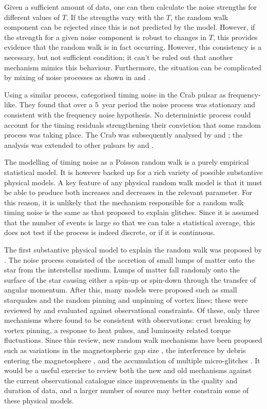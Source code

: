 Given a sufficient amount of data, one can then calculate the noise strengths
for different values of $T$. If the strengths vary with the $T$, the random
walk component can be rejected since this is not predicted by the model.
However, if the strength for a given noise component is robust to changes in
$T$, this provides evidence that the random walk is in fact occurring.  However,
this consistency is a necessary, but not sufficient condition; it can't be
ruled out that another mechanism mimics this behaviour. Furthermore, the
situation can be complicated by mixing of noise processes as shown in
\citet{Groth1975} and \citet{Cordes1980}.

Using a similar process, \citet{Boynton1972} categorised timing noise in the
Crab pulsar as frequency-like. They found that over a $5$~year period
the noise process was stationary and consistent with the frequency noise
hypothesis. No deterministic process could account for the timing residuals
strengthening their conviction that some random process was taking place. The
Crab was subsequently analysed by \citet{Groth1975} and \citet{Cordes1980}; the
analysis was extended to other pulsars by \citet{Helfand1980} and
\citet{CordesHelfand1980}.

The modelling of timing noise as a Poisson random walk is a purely
empirical statistical model. It is however backed up for a rich variety of
possible substantive physical models.  A key feature of any physical random
walk model is that it must be able to produce both increases and decreases in
the relevant parameter. For this reason, it is unlikely that the mechanism
responsible for a random walk timing noise is the same as that proposed
to explain glitches. Since it is assumed that the number of events
is large so that we can take a statistical average, this does not test if the
process is indeed discrete, or if it is continuous.

The first substantive physical model to explain the random walk was proposed by
\citet{Boynton1972}. The noise process consisted of the accretion of small
lumps of matter onto the star from the interstellar medium. Lumps of matter fall
randomly onto the surface of the star causing either a spin-up or spin-down
through the transfer of angular momentum. After this, many models were proposed
such as small starquakes and the random pinning and unpinning of vortex lines; these
were reviewed by \citet{Cordes1981} and evaluated against observational
constraints. Of these, only three mechanisms where found to be consistent with
observations: crust breaking by vortex pinning, a response to heat pulses, and
luminosity related torque fluctuations. Since this review, new random walk
mechanisms have been proposed such as variations in the magnetospheric gap
size \citep{Cheng1987}, the interference by debris entering the magnetosphere
\citep{Cordes2008}, and the accumulation of multiple micro-glitches
\citep{Janssen2006}. It would be a useful exercise to review both the new and
old mechanisms against the current observational catalogue since improvements in
the quality and duration of data, and a larger number of source may better
constrain some of these physical models.

